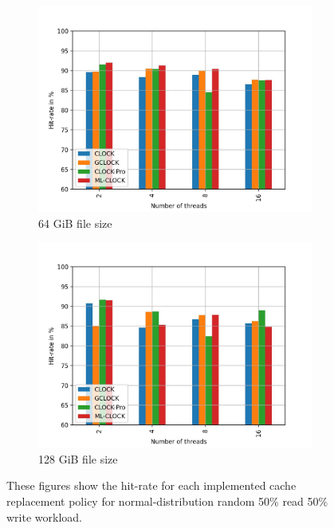 \documentclass[
	12pt,
	a4paper,
	abstract,
	bibliography=totoc,
	chapterprefix,
	headings=openright,
	numbers=endperiod,
	parskip=half,
	twoside,
]{scrreprt}
\begin{document}
\begin{figure}[H]
\begin{subfigure}{0.4\textwidth}
		\includegraphics[width=\textwidth]{multi_64_gb_rw_50to50_zipf.jpg}		
		\caption{64 GiB file size}
		\label{fig:rw_90to10  zoned}
	\end{subfigure}
	\hfill
	\begin{subfigure}{0.4\textwidth}
		\includegraphics[width=\textwidth]{multi_128_gb_rw_50to50_zipf.jpg}		
		\caption{128 GiB file size}
		\label{fig:rw_90to10  uniform}
	\end{subfigure}
	\caption{These figures show the hit-rate for each implemented cache replacement policy for normal-distribution random 50\% read 50\% write workload.}
\end{figure}

\end{document}
